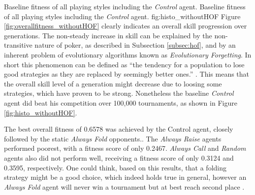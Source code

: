   {Baseline fitness of all playing styles including the \textit{Control} agent.}%
  {Baseline fitness of all playing styles including the \textit{Control} agent.}%
  {fig:histo_withoutHOF}%
Figure \ref{fig:overallfitness_withoutHOF} clearly indicates an overall skill progression over generations. The non-steady increase in skill can be explained by the non-transitive nature of poker, as described in Subsection \ref{subsec:hof}, and by an inherent problem of evolutionary algorithms known as \textit{Evolutionary Forgetting}. In short this phenomenon can be defined as \enquote{the tendency for a population to lose good strategies as they are replaced by seemingly better ones.} \cite[p.63]{evolutionary_methods}. This means that the overall skill level of a generation might decrease due to loosing some strategies, which have proven to be strong. Nonetheless the baseline \textit{Control} agent did beat his competition over 100,000 tournaments, as shown in Figure \ref{fig:histo_withoutHOF}.\par
The best overall fitness of 0.6578 was achieved by the Control agent, closely followed by the static \textit{Always Fold} opponents.. The \textit{Always Raise} agents performed poorest, with a fitness score of only 0.2467. \textit{Always Call} and \textit{Random} agents also did not perform well, receiving a fitness score of only 0.3124 and 0.3595, respectively. One could think, based on this results, that a folding strategy might be a good choice, which indeed holds true in general, however an \textit{Always Fold} agent will never win a tournament but at best reach second place \cite{evolutionary_methods}.
